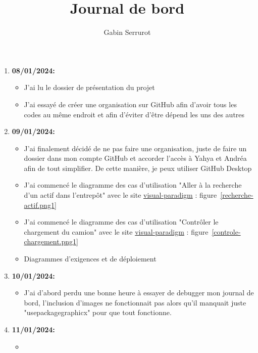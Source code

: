 \documentclass[10pt,a4paper]{article}
\title{Journal de bord}
\author{Gabin Serrurot}
\begin{document}
\maketitle

\begin{enumerate}
    \item \textbf{08/01/2024:}
        \begin{itemize}
            \item J'ai lu le dossier de présentation du projet
            \item J'ai essayé de créer une organisation sur GitHub afin d'avoir tous les codes au même endroit et afin d'éviter d'être dépend les uns des autres
        \end{itemize}
    \item \textbf{09/01/2024:}
        \begin{itemize}
            \item J'ai finalement décidé de ne pas faire une organisation, juste de faire un dossier dans mon compte GitHub et accorder l'accès à Yahya et Andréa afin de tout simplifier. De cette manière, je peux utiliser GitHub Desktop
            \item J'ai commencé le diagramme des cas d'utilisation "Aller à la recherche d’un actif dans l’entrepôt" avec le site \href{https://online.visual-paradigm.com}{visual-paradigm} : figure~\ref{recherche-actif.png1}
            \item J'ai commencé le diagramme des cas d'utilisation "Contrôler le chargement du camion" avec le site \href{https://online.visual-paradigm.com}{visual-paradigm} : figure~\ref{controle-chargement.png1}
            \item Diagrammes d'exigences et de déploiement
        \end{itemize}
    \item \textbf{10/01/2024:}
        \begin{itemize}
            \item J'ai d'abord perdu une bonne heure à essayer de debugger mon journal de bord, l'inclusion d'images ne fonctionnait pas alors qu'il manquait juste "usepackage{graphicx}" pour que tout fonctionne.
        \end{itemize}
    \item \textbf{11/01/2024:}
        \begin{itemize}
            \item 
        \end{itemize}
\end{enumerate}
\end{document}
